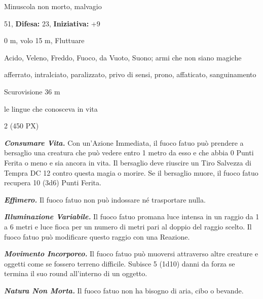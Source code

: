 \begin{multicols}{2}
{
\noindent
\begin{description}[noitemsep, topsep=0pt, parsep=0pt, partopsep=0pt, leftmargin=0cm, labelwidth=2.2cm]
	\item[\textbf{Taglia/Tipo:}] Minuscola non morto, malvagio
	\item[\textbf{Caratt.:}] 
	\item[\textbf{Punti Ferita:}] 51,  \textbf{Difesa:} 23,  \textbf{Iniziativa:} +9
	\item[\textbf{Movimento:}] 0 m, volo 15 m, Fluttuare
	\item[\textbf{Tiri Salvez.:}] 
	\item[\textbf{Res. Danni:}] Acido, Veleno, Freddo, Fuoco, da Vuoto, Suono; armi che non siano magiche
	\item[\textbf{Immunità:}] afferrato, intralciato, paralizzato, privo di sensi, prono, affaticato, sanguinamento
	\item[\textbf{Sensi:}] Scurovisione 36 m
	\item[\textbf{Linguaggi:}] le lingue che conosceva in vita
	\item[\textbf{Sfida:}] 2 (450 PX)\smallskip
\end{description}

\emph{\textbf{Consumare Vita.}} Con un'Azione Immediata, il fuoco fatuo può prendere a bersaglio una creatura che può vedere entro 1 metro da esso e che abbia 0 Punti Ferita o meno e sia ancora in vita. Il bersaglio deve riuscire un Tiro Salvezza di Tempra DC 12 contro questa magia o morire. Se il bersaglio muore, il fuoco fatuo recupera 10 (3d6) Punti Ferita.

\emph{\textbf{Effimero.}} Il fuoco fatuo non può indossare né trasportare nulla.

\emph{\textbf{Illuminazione Variabile.}} Il fuoco fatuo promana luce intensa in un raggio da 1 a 6 metri e luce fioca per un numero di metri pari al doppio del raggio scelto. Il fuoco fatuo può modificare questo raggio con una Reazione.

\emph{\textbf{Movimento Incorporeo.}} Il fuoco fatuo può muoversi attraverso altre creature e oggetti come se fossero terreno difficile. Subisce 5 (1d10) danni da forza se termina il suo round all'interno di un oggetto.

\emph{\textbf{Natura Non Morta.}} Il fuoco fatuo non ha bisogno di aria, cibo o bevande.

}
\end{multicols}
